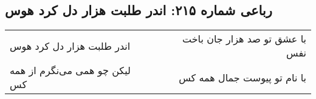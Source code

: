 \begin{center}
\section*{رباعی شماره ۲۱۵: اندر طلبت هزار دل کرد هوس}
\label{sec:sh215}
\begin{longtable}{l p{0.5cm} r}
اندر طلبت هزار دل کرد هوس
&&
با عشق تو صد هزار جان باخت نفس
\\
لیکن چو همی می‌نگرم از همه کس
&&
با نام تو پیوست جمال همه کس
\\
\end{longtable}
\end{center}
